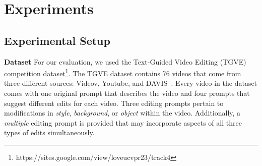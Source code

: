 \section{Experiments}\label{sec.expt}

\subsection{Experimental Setup}
\noindent\textbf{Dataset}
For our evaluation, we used the Text-Guided Video Editing (TGVE) competition dataset\footnote{https://sites.google.com/view/loveucvpr23/track4}. The TGVE dataset contains 76 videos that come from three different sources: Videov, Youtube, and DAVIS~\cite{DAVIS}. Every video in the dataset comes with one original prompt that describes the video and four prompts that suggest different edits for each video. Three editing prompts pertain to modifications in \textit{style}, \textit{background}, or \textit{object} within the video. Additionally, a \textit{multiple} editing prompt is provided that may incorporate aspects of all three types of edits simultaneously.



